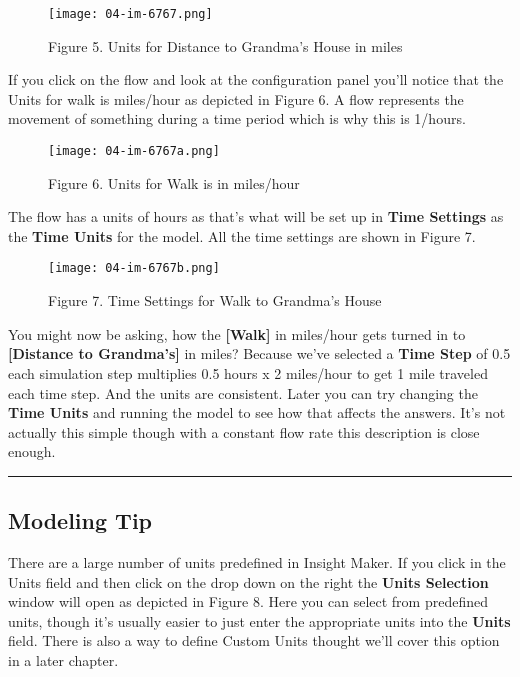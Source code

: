 \documentclass[]{memoir}
\let\Oldincludegraphics\includegraphics
\renewcommand{\includegraphics}[1]{\Oldincludegraphics[max size={\textwidth}{\textheight}]{#1}}
\newcommand{\p}[1]{\textbf{{[}#1{]}}}
\renewcommand{\u}[1]{\textbf{#1}}
\renewcommand{\a}[1]{\textbf{#1}}
\begin{document}
\begin{figure}[htbp]
\centering
\texttt{[image: 04-im-6767.png]}
\caption{Figure 5. Units for Distance to Grandma's House in miles}
\end{figure}

If you click on the flow and look at the configuration panel you'll
notice that the Units for walk is miles/hour as depicted in Figure 6. A
flow represents the movement of something during a time period which is
why this is 1/hours.

\begin{figure}[htbp]
\centering
\texttt{[image: 04-im-6767a.png]}
\caption{Figure 6. Units for Walk is in miles/hour}
\end{figure}

The flow has a units of hours as that's what will be set up in
\u{Time Settings} as the \u{Time Units} for the model. All the time
settings are shown in Figure 7.

\begin{figure}[htbp]
\centering
\texttt{[image: 04-im-6767b.png]}
\caption{Figure 7. Time Settings for Walk to Grandma's House}
\end{figure}

You might now be asking, how the \p{Walk} in miles/hour gets turned in
to \p{Distance to Grandma's} in miles? Because we've selected a
\a{Time Step} of 0.5 each simulation step multiplies 0.5 hours x 2
miles/hour to get 1 mile traveled each time step. And the units are
consistent. Later you can try changing the \u{Time Units} and running
the model to see how that affects the answers. It's not actually this
simple though with a constant flow rate this description is close
enough.

\begin{center}\rule{3in}{0.4pt}\end{center}

\subsection{Modeling Tip}

There are a large number of units predefined in Insight Maker. If you
click in the Units field and then click on the drop down on the right
the \u{Units Selection} window will open as depicted in Figure 8. Here
you can select from predefined units, though it's usually easier to just
enter the appropriate units into the \a{Units} field. There is also a
way to define Custom Units thought we'll cover this option in a later
chapter.
\end{document}
